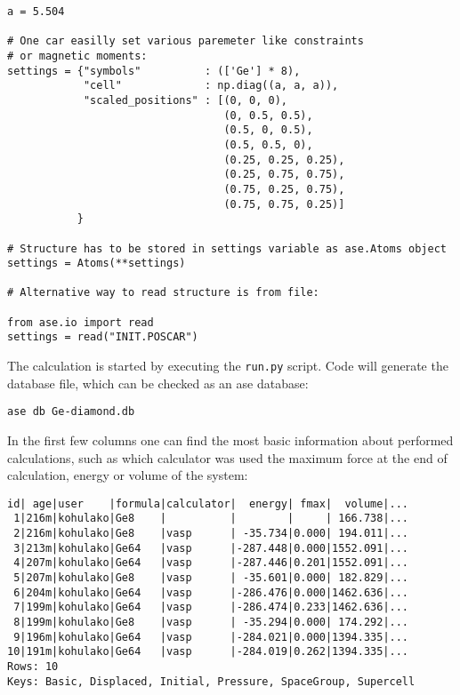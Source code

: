 \documentclass[12pt]{article}
\begin{document}
\begin{verbatim}
a = 5.504

# One car easilly set various paremeter like constraints
# or magnetic moments:
settings = {"symbols"          : (['Ge'] * 8),
            "cell"             : np.diag((a, a, a)),
            "scaled_positions" : [(0, 0, 0),
                                  (0, 0.5, 0.5),
                                  (0.5, 0, 0.5),
                                  (0.5, 0.5, 0),
                                  (0.25, 0.25, 0.25),
                                  (0.25, 0.75, 0.75),
                                  (0.75, 0.25, 0.75),
                                  (0.75, 0.75, 0.25)]
           }

# Structure has to be stored in settings variable as ase.Atoms object
settings = Atoms(**settings)

# Alternative way to read structure is from file:

from ase.io import read
settings = read("INIT.POSCAR")

\end{verbatim}

The calculation is started by executing the \texttt{run.py} script. Code will generate the database file, which can be checked as an ase database:

\begin{verbatim}
ase db Ge-diamond.db
\end{verbatim}

In the first few columns one can find the most basic information about performed calculations, such as which calculator was used the maximum force at the end of calculation, energy or volume of the system:

\begin{verbatim}
id| age|user    |formula|calculator|  energy| fmax|  volume|...
 1|216m|kohulako|Ge8    |          |        |     | 166.738|...
 2|216m|kohulako|Ge8    |vasp      | -35.734|0.000| 194.011|...
 3|213m|kohulako|Ge64   |vasp      |-287.448|0.000|1552.091|...
 4|207m|kohulako|Ge64   |vasp      |-287.446|0.201|1552.091|...
 5|207m|kohulako|Ge8    |vasp      | -35.601|0.000| 182.829|...
 6|204m|kohulako|Ge64   |vasp      |-286.476|0.000|1462.636|...
 7|199m|kohulako|Ge64   |vasp      |-286.474|0.233|1462.636|...
 8|199m|kohulako|Ge8    |vasp      | -35.294|0.000| 174.292|...
 9|196m|kohulako|Ge64   |vasp      |-284.021|0.000|1394.335|...
10|191m|kohulako|Ge64   |vasp      |-284.019|0.262|1394.335|...
Rows: 10
Keys: Basic, Displaced, Initial, Pressure, SpaceGroup, Supercell

\end{verbatim}
\end{document}
